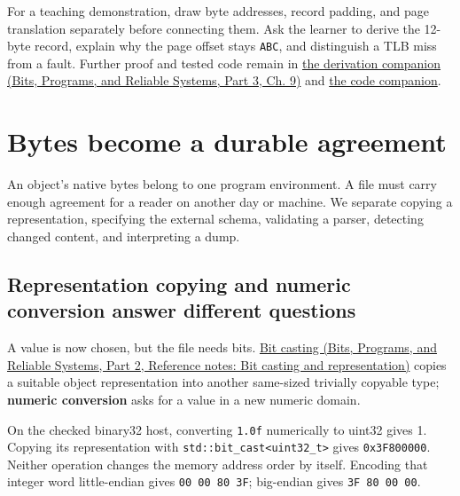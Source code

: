 For a teaching demonstration, draw byte addresses, record padding, and page translation separately before connecting them. Ask the learner to derive the 12-byte record, explain why the page offset stays \texttt{ABC}, and distinguish a TLB miss from a fault. Further proof and tested code remain in \href{../01-Bits-Programs-and-Reliable-Systems-P03/main.pdf\#nameddest=01-foundations-i-ch011-m003---byte-order-layout-and-translation}{the derivation companion (Bits, Programs, and Reliable Systems, Part 3, Ch. 9)} and \hyperref[appendix-4e2236f53445-m003---explicit-byte-codecs-and-checked-alignment]{the code companion}.

\section{Bytes become a durable agreement}\label{05-engine-i-ch002-bytes-become-a-durable-agreement}

\hypertarget{05-engine-i-ch002-bytes-become-a-durable-agreement}{}

An object's native bytes belong to one program environment. A file must carry enough agreement for a reader on another day or machine. We separate copying a representation, specifying the external schema, validating a parser, detecting changed content, and interpreting a dump.

\subsection{Representation copying and numeric conversion answer different questions}\label{05-engine-i-ch002-representation-copying-and-numeric-conversion-answer-different-questions}

\hypertarget{05-engine-i-ch002-representation-copying-and-numeric-conversion-answer-different-questions}{}

A value is now chosen, but the file needs bits. \href{../01-Bits-Programs-and-Reliable-Systems-P02/main.pdf\#nameddest=appendix-34ee45f161c1}{Bit casting (Bits, Programs, and Reliable Systems, Part 2, Reference notes: Bit casting and representation)} copies a suitable object representation into another same-sized trivially copyable type; \textbf{numeric conversion} asks for a value in a new numeric domain.

On the checked binary32 host, converting \texttt{1.0f} numerically to uint32 gives 1. Copying its representation with \texttt{std::bit\_cast\textless{}uint32\_t\textgreater{}} gives \texttt{0x3F800000}. Neither operation changes the memory address order by itself. Encoding that integer word little-endian gives \texttt{00\ 00\ 80\ 3F}; big-endian gives \texttt{3F\ 80\ 00\ 00}.

